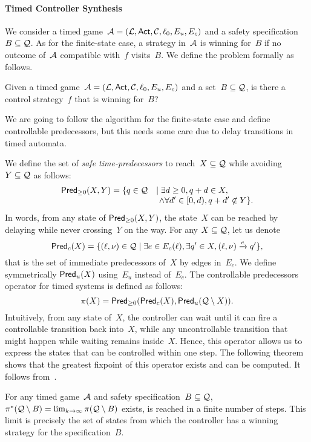 \documentclass{article}
\begin{document}
\paragraph{Timed Controller Synthesis}
We consider a timed game~$\TA = (\Locs,\Act,\Clocks,\penalty0 \ell_0,E_u,E_c)$
and a safety specification~$B \subseteq \mathcal{Q}$. As for the finite-state case,
a strategy in~$\mathcal{A}$ is winning for~$B$ if no outcome of~$\mathcal{A}$ compatible
with~$f$ visits~$B$. We define the problem formally as follows.

\begin{problem}
   Given a timed game~$\TA = (\Locs,\Act,\Clocks,\penalty0 \ell_0,E_u,E_c)$ 
   and a set~$B \subseteq \mathcal{Q}$, is there a control
   strategy~$f$ that is winning for~$B$?
\end{problem}

We are going to follow the algorithm for the finite-state case and define
controllable predecessors, but this needs some care due to delay transitions in
timed automata.

We define the set of \emph{safe time-predecessors} to reach~$X \subseteq \mathcal{Q}$ while
avoiding~$Y \subseteq \mathcal{Q}$ as follows:
\[
  \begin{array}{ll}
    \textrm{\sf Pred}_{\geq 0}(X,Y) = \{q \in \mathcal{Q} &\mid \exists d\geq 0, q+d \in X,\\
      &~ \land \forall d' \in[0,d), q+d' \not \in Y\}.
  \end{array}
\]
In words, from any state of $\textrm{\sf Pred}_{\geq 0}(X,Y)$, the state~$X$ can be reached by
delaying while never crossing~$Y$ on the way. 
For any $X \subseteq \mathcal{Q}$, let us denote
\[\textrm{\sf Pred}_c(X) = \{ (\ell,\nu) \in \mathcal{Q} \mid \exists e \in E_c(\ell), 
\exists q' \in X, (\ell,\nu) \xrightarrow{e} q'\},\]
that is the set of immediate predecessors of~$X$ by edges in~$E_c$.
We define symmetrically $\textrm{\sf Pred}_u(X)$ using~$E_u$ instead of~$E_c$.
The controllable predecessors
operator for timed systems is defined as follows:
\[
  \pi(X) = \textrm{\sf Pred}_{\geq 0}(\textrm{\sf Pred}_c(X), \textrm{\sf Pred}_u(\mathcal{Q} \setminus X)).
\]
Intuitively, from any state of~$X$, the controller can wait until it can fire a controllable
transition back into~$X$, while any uncontrollable transition that might happen
while waiting remains inside~$X$.
Hence, this operator allows us to express the states that can be controlled
within one step. The following theorem shows that the greatest fixpoint of this
operator exists and can be computed. It follows from~\cite{AMPS98,AMP-concur98}.

\begin{theorem}
   \label{thm:timed-control}
   For any timed game~$\mathcal{A}$ and safety specification~$B \subseteq \mathcal{Q}$, 
   $\pi^*(\mathcal{Q}\setminus B) = \lim_{k \rightarrow \infty} \pi(\mathcal{Q}\setminus B)$ exists, is reached 
   in a finite number of steps. This limit is precisely the set of states from
   which the controller has a winning strategy for the specification~$B$.
\end{theorem}
\end{document}
